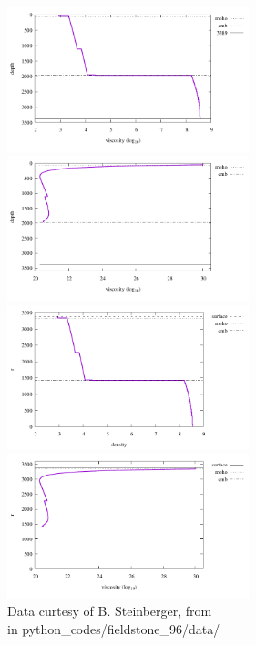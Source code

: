 \begin{center}
\includegraphics[width=7cm]{python_codes/fieldstone_96/data/rho1}
\includegraphics[width=7cm]{python_codes/fieldstone_96/data/eta1}\\
\includegraphics[width=7cm]{python_codes/fieldstone_96/data/rho2}
\includegraphics[width=7cm]{python_codes/fieldstone_96/data/eta2}\\
{\captionfont Data curtesy of B. Steinberger, from \cite{stwt10}} \\
{\tiny {\color{gray} in python\_codes/fieldstone\_96/data/}}
\end{center}


